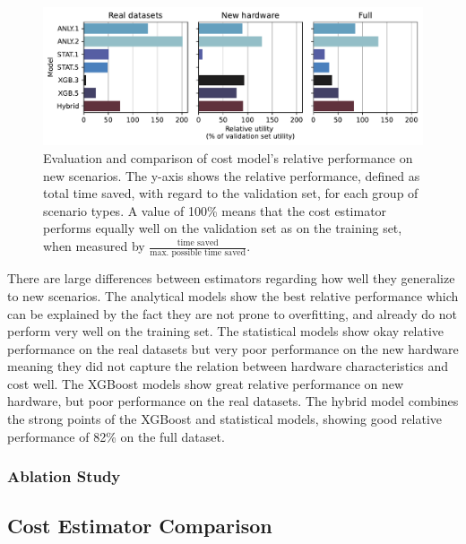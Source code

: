 \begin{figure}
    \centering
    \includegraphics[width=\linewidth]{chapters/06_evaluation/figures/eval_generalization.pdf}
    \caption[Evaluation of performance on new scenarios]{Evaluation and comparison of cost model's relative performance on new scenarios. The y-axis shows the relative performance, defined as total time saved, with regard to the validation set, for each group of scenario types. A value of 100\% means that the cost estimator performs equally well on the validation set as on the training set, when measured by $\frac{\text{time saved}}{\text{max. possible time saved}}$.}
    \label{fig:6-generalization}
\end{figure}

There are large differences between estimators regarding how well they generalize to new scenarios. The analytical models show the best relative performance which can be explained by the fact they are not prone to overfitting, and already do not perform very well on the training set. The statistical models show okay relative performance on the real datasets but very poor performance on the new hardware meaning they did not capture the relation between hardware characteristics and cost well. The XGBoost models show great relative performance on new hardware, but poor performance on the real datasets. The hybrid model combines the strong points of the XGBoost and statistical models, showing good relative performance of 82\% on the full dataset.

\subsubsection{Ablation Study}
\label{subsubsec:6-ablation}

\subsection{Cost Estimator Comparison}
\label{subsec:6-sota-comparison}

